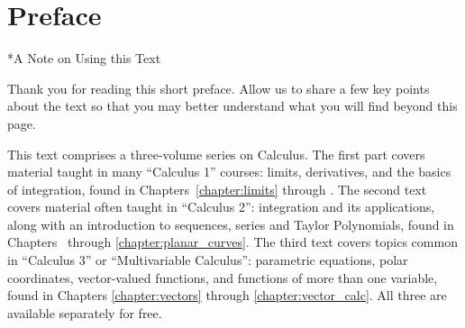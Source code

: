 \prefacegeometry
\chapter*{Preface}
\pagestyle{plain} %
\thispagestyle{empty}

\bgroup
\makeatletter
\renewcommand \section
 { \@startsection{section}{1}{0pt}{-3.25ex\@plus -1ex \@minus -.2ex}{1.5ex \@plus .2ex}{\normalfont \large \bfseries }}
\makeatother

\section*{A Note on Using this Text}

Thank you for reading this short preface. Allow us to share a few key points about the text so that you may better understand what you will find beyond this page.

This text comprises a three-volume series on Calculus.
The first part covers material taught in many ``Calculus 1'' courses: limits, derivatives, and the basics of integration, found in Chapters~\ref{chapter:limits} through
\iftoggle{bsc}{\ref{chapter:integration}}{\ref{chapter:app_of_int}}.
The second text covers material often taught in ``Calculus 2'': integration and its applications, along with an introduction to sequences, series and Taylor Polynomials, found in
Chapters~\iftoggle{bsc}{\ref{chapter:app_of_int}}{\ref{chapter:diff_conc}}
through \ref{chapter:planar_curves}. The third text covers topics common in ``Calculus 3'' or ``Multivariable Calculus'': parametric equations, polar coordinates, vector-valued functions, and functions of more than one variable, found in Chapters \ref{chapter:vectors} through \ref{chapter:vector_calc}. All three are available separately for free.

